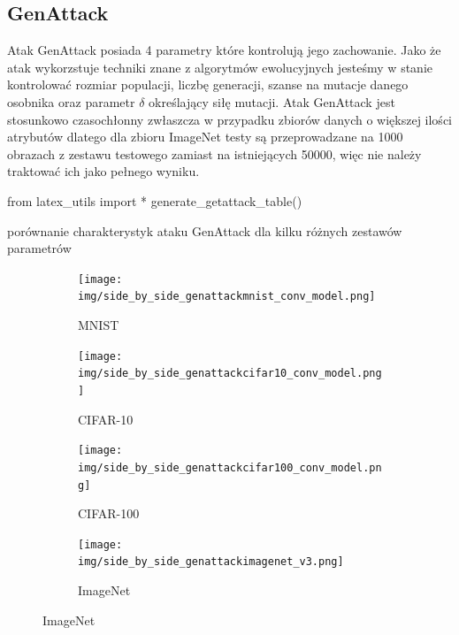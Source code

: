 \documentclass[
    left=2.5cm,         %
    right=2.5cm,        %
    top=2.5cm,          %
    bottom=3cm,         %
    bindingoffset=6mm,  %
    nohyphenation=false %
]{eiti/eiti-thesis}
\begin{document}
\subsection{GenAttack}
Atak GenAttack posiada 4 parametry które kontrolują jego zachowanie. Jako że atak wykorzstuje techniki
znane z algorytmów ewolucyjnych jesteśmy w stanie kontrolować rozmiar populacji, liczbę generacji, szanse na mutacje
danego osobnika oraz parametr \(\delta\) określający siłę mutacji. Atak GenAttack jest stosunkowo czasochłonny zwłaszcza
w przypadku zbiorów danych o większej ilości atrybutów dlatego dla zbioru ImageNet\cite{ILSVRC15} testy są przeprowadzane
na 1000 obrazach z zestawu testowego zamiast na istniejących 50000, więc nie należy traktować ich jako pełnego wyniku.

\begin{table}[h]
\begin{adjustbox}{max width=\textwidth}
\begin{pycode}
from latex_utils import *
generate_getattack_table()
\end{pycode}
\end{adjustbox}
\caption{porównanie charakterystyk ataku GenAttack dla kilku różnych zestawów parametrów}
\end{table}

\begin{figure}[H]
    \caption{Przykłady wygenerowanych złośliwych przykładów z zadaną klasą za pomocą metody GenAttack}

    \begin{subfigure}[t]{0.48\textwidth}
        \texttt{[image: img/side\_by\_side\_genattackmnist\_conv\_model.png]}
        \caption{MNIST}
        \label{fig:mnist_grid_genattack}
    \end{subfigure}%
    \hfill
    \begin{subfigure}[t]{0.48\textwidth}
        \texttt{[image: img/side\_by\_side\_genattackcifar10\_conv\_model.png]}
        \caption{CIFAR-10}
        \label{fig:cifar10_grid_genattack}
    \end{subfigure}%

    \begin{subfigure}[t]{0.48\textwidth}
        \texttt{[image: img/side\_by\_side\_genattackcifar100\_conv\_model.png]}
        \caption{CIFAR-100}
        \label{fig:cifar100_grid_genattack}
    \end{subfigure}%
    \hfill
    \begin{subfigure}[t]{0.48\textwidth}
        \texttt{[image: img/side\_by\_side\_genattackimagenet\_v3.png]}
        \caption{ImageNet}
        \label{fig:imagenet_grid_genattack}
    \end{subfigure}%

\end{figure}
\end{document}

